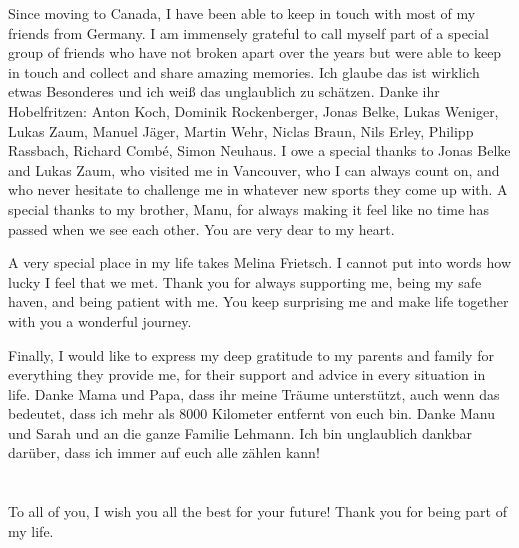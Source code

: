 Since moving to Canada, I have been able to keep in touch with most of my friends from Germany. 
I am immensely grateful to call myself part of a special group of friends who have not broken apart over the years but were able to keep in touch and collect and share amazing memories.
Ich glaube das ist wirklich etwas Besonderes und ich weiß das unglaublich zu schätzen. Danke ihr Hobelfritzen: 
Anton Koch, Dominik Rockenberger, Jonas Belke, Lukas Weniger, Lukas Zaum, Manuel Jäger, Martin Wehr, Niclas Braun, Nils Erley, Philipp Rassbach, Richard Combé, Simon Neuhaus.
I owe a special thanks to Jonas Belke and Lukas Zaum, who visited me in Vancouver, who I can always count on, and who never hesitate to challenge me in whatever new sports they come up with. 
A special thanks to my brother, Manu, for always making it feel like no time has passed when we see each other. You are very dear to my heart. 

A very special place in my life takes Melina Frietsch. 
I cannot put into words how lucky I feel that we met.
Thank you for always supporting me, being my safe haven, and being patient with me. 
You keep surprising me and make life together with you a wonderful journey.

Finally, I would like to express my deep gratitude to my parents and family for everything they provide me, for their support and advice in every situation in life.
Danke Mama und Papa, dass ihr meine Träume unterstützt, auch wenn das bedeutet, dass ich mehr als 8000 Kilometer entfernt von euch bin. 
Danke Manu und Sarah und an die ganze Familie Lehmann.
Ich bin unglaublich dankbar darüber, dass ich immer auf euch alle zählen kann!

\paragraph{}\mbox{}\\
To all of you, I wish you all the best for your future!
Thank you for being part of my life. 